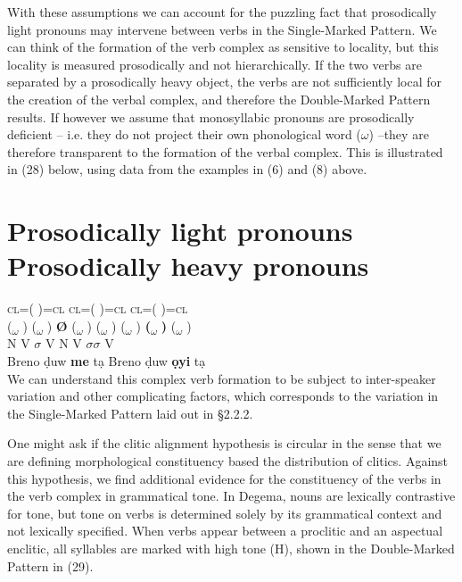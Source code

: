 With these assumptions we can account for the puzzling fact that prosodically light pronouns may intervene between verbs in the Single-Marked Pattern. We can think of the formation of the verb complex as sensitive to locality, but this locality is measured prosodically and not hierarchically. If the two verbs are separated by a prosodically heavy object, the verbs are not sufficiently local for the creation of the verbal complex, and therefore the Double-Marked Pattern results. If however we assume that monosyllabic pronouns are prosodically deficient – i.e. they do not project their own phonological word ($\omega $) –they are therefore transparent to the formation of the verbal complex. This is illustrated in (28) below, using data from the examples in (6) and (8) above. 

\chapter[Prosodically light pronouns         Prosodically heavy pronouns]{Prosodically light pronouns         Prosodically heavy pronouns}
\label{bkm:Ref449531282}              \textsc{cl}=(\textsubscript{  }        )=\textsc{cl    }         \textsc{cl}=(\textsubscript{  })=\textsc{cl   cl}=(  )=\textsc{cl}\\
     (\textsubscript{$\omega $}     )    (\textsubscript{$\omega $}   ) \textbf{ Ø}   (\textsubscript{$\omega $}  )       (\textsubscript{$\omega $}    )        (\textsubscript{$\omega $}  )   \textbf{(}\textbf{\textsubscript{$\omega $}}\textbf{  )}  (\textsubscript{$\omega $}  )\\
     N      V  \textbf{  $\sigma $}   V         N      V    \textbf{$\sigma \sigma $}    V\\
\gll   Breno    ḍuw  \textbf{me}   tạ         Breno    ḍuw    \textbf{ọyi}    tạ\\
We can understand this complex verb formation to be subject to inter-speaker variation and other complicating factors, which corresponds to the variation in the Single-Marked Pattern laid out in §2.2.2.

One might ask if the clitic alignment hypothesis is circular in the sense that we are defining morphological constituency based the distribution of clitics. Against this hypothesis, we find additional evidence for the constituency of the verbs in the verb complex in grammatical tone. In Degema, nouns are lexically contrastive for tone, but tone on verbs is determined solely by its grammatical context and not lexically specified. When verbs appear between a proclitic and an aspectual enclitic, all syllables are marked with high tone (H), shown in the Double-Marked Pattern in (29).

